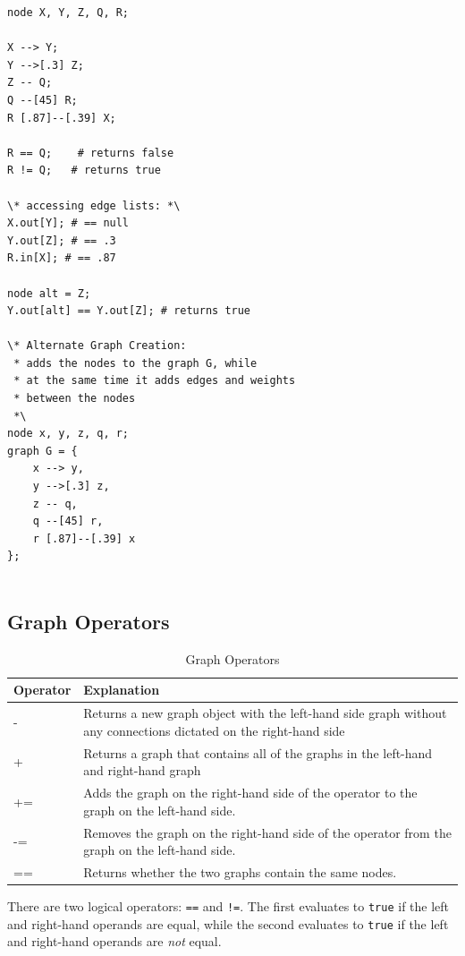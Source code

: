 \documentclass{article}
\newcommand{\code}[1]{\texttt{#1}} %
\begin{document}
\begin{lstlisting}[language=pltLang, caption=Shows the use of node operators that creates the graph in Figure \ref{fig:node_ops}., label=lst:node-ops]
node X, Y, Z, Q, R;

X --> Y;
Y -->[.3] Z;
Z -- Q;
Q --[45] R;
R [.87]--[.39] X;

R == Q;    # returns false
R != Q;   # returns true

\* accessing edge lists: *\
X.out[Y]; # == null
Y.out[Z]; # == .3
R.in[X]; # == .87

node alt = Z;
Y.out[alt] == Y.out[Z]; # returns true

\* Alternate Graph Creation:
 * adds the nodes to the graph G, while
 * at the same time it adds edges and weights
 * between the nodes
 *\
node x, y, z, q, r;
graph G = {
    x --> y,
    y -->[.3] z,
    z -- q,
    q --[45] r,
    r [.87]--[.39] x
};
    

\end{lstlisting}

\subsection{Graph Operators}

\begin{table}[H]
\centering
\begin{tabular}{| p{1.5in} | p{2.75in} |}
\hline
Operator & Explanation \\
\hline
- & Returns a new graph object with the left-hand side graph without any connections dictated on the right-hand side \\
\hline
+ & Returns a graph that contains all of the graphs in the left-hand and right-hand graph \\
\hline
+= & Adds the graph on the right-hand side of the operator to the graph on the left-hand side. \\
\hline
-= & Removes the graph on the right-hand side of the operator from the graph on the left-hand side. \\
\hline
== & Returns whether the two graphs contain the same nodes. \\
\hline
\end{tabular}
\caption{Graph Operators}
\label{tbl:graph-ops}
\end{table}

There are two logical operators: \code{==} and \code{!=}. The first evaluates to \code{true} if the left and right-hand operands are equal, while the second evaluates to \code{true} if the left and right-hand operands are \emph{not} equal.
\end{document}
